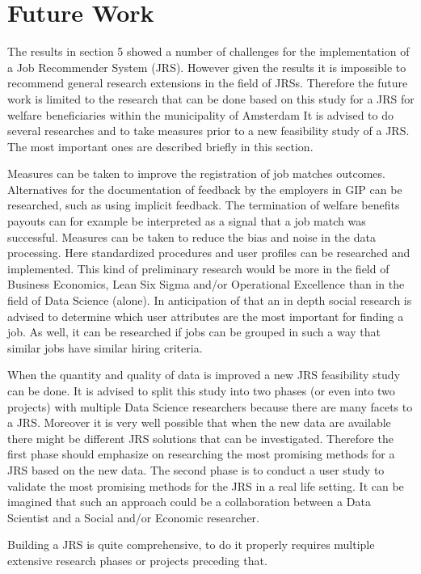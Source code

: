 \section{Future Work}
\label{sec:fut}

The results in section 5 showed a number of challenges for the implementation of a Job Recommender System (JRS).
However given the results it is impossible to recommend general research extensions in the field of JRSs. 
Therefore the future work is limited to the research that can be done based on this study for a JRS for welfare beneficiaries within the municipality of Amsterdam
It is advised to do several researches and to take measures prior to a new feasibility study of a JRS.
The most important ones are described briefly in this section.

Measures can be taken to improve the registration of job matches outcomes.
Alternatives for the documentation of feedback by the employers in GIP can be researched, such as using implicit feedback.
The termination of welfare benefits payouts can for example be interpreted as a signal that a job match was successful. 
Measures can be taken to reduce the bias and noise in the data processing.
Here standardized procedures and user profiles can be researched and implemented.
This kind of preliminary research would be more in the field of Business Economics, Lean Six Sigma and/or Operational Excellence than in the field of Data Science (alone).
In anticipation of that an in depth social research is advised to determine which user attributes are the most important for finding a job.
As well, it can be researched if jobs can be grouped in such a way that similar jobs have similar hiring criteria.

When the quantity and quality of data is improved a new JRS feasibility study can be done.
It is advised to split this study into two phases (or even into two  projects) with multiple Data Science researchers because there are many facets to a JRS. 
Moreover it is very well possible that when the new data are available there might be different JRS solutions that can be investigated.
Therefore the first phase should emphasize on researching the most promising methods for a JRS based on the new data.
The second phase is to conduct a user study to validate the most promising methods for the JRS in a real life setting.
It can be imagined that such an approach could be a collaboration between a Data Scientist and a Social and/or Economic researcher.  

Building a JRS is quite comprehensive, to do it properly requires multiple extensive research phases or projects preceding that.
